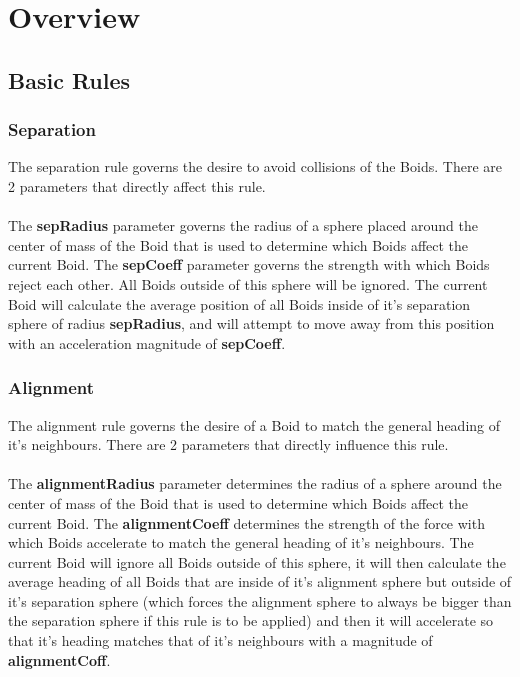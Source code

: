 \documentclass[12pt]{article}
\begin{document}
\section{Overview}
\subsection{Basic Rules}
\subsubsection{Separation}
The separation rule governs the desire to avoid collisions of the Boids. There are 2 parameters that directly affect this rule.
\\ \\
The \textbf{sepRadius} parameter governs the radius of a sphere placed around the center of mass of the Boid that is used to determine which Boids affect the current Boid. The \textbf{sepCoeff} parameter governs the strength with which Boids reject each other. All Boids outside of this sphere will be ignored. The current Boid will calculate the average position of all Boids inside of it's separation sphere of radius \textbf{sepRadius}, and will attempt to move away from this position with an acceleration magnitude of \textbf{sepCoeff}.

\subsubsection{Alignment}
The alignment rule governs the desire of a Boid to match the general heading of it's neighbours. There are 2 parameters that directly influence this rule.
\\ \\
The \textbf{alignmentRadius} parameter determines the radius of a sphere around the center of mass of the Boid that is used to determine which Boids affect the current Boid. The \textbf{alignmentCoeff} determines the strength of the force with which Boids accelerate to match the general heading of it's neighbours. The current Boid will ignore all Boids outside of this sphere, it will then calculate the average heading of all Boids that are inside of it's alignment sphere but outside of it's separation sphere (which forces the alignment sphere to always be bigger than the separation sphere if this rule is to be applied) and then it will accelerate so that it's heading matches that of it's neighbours with a magnitude of \textbf{alignmentCoff}.
\end{document}

